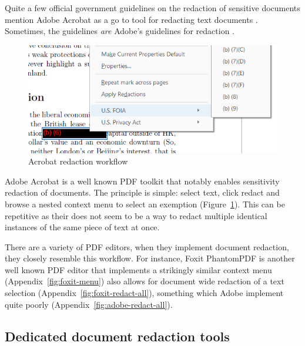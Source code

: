 \documentclass[\version]{l4proj}
\begin{document}
Quite a few official government guidelines on the redaction of sensitive documents mention Adobe Acrobat as a go to tool for redacting text documents \autocite{thenationalarchivesRedactionToolkitPaper2016}.
Sometimes, the guidelines \textit{are} Adobe's guidelines for redaction \autocite{scottishgovernmentRedactingInformation2019}.

\begin{figure}
    \includegraphics[width=\linewidth]{images/related_products/adobe_redaction.png}
    \caption{Acrobat redaction workflow}\label{fig:adobe-redaction}
    \vspace{-20pt}
\end{figure}

Adobe Acrobat is a well known PDF toolkit that notably enables sensitivity redaction of documents.
The principle is simple: select text, click redact and browse a nested context menu to select an exemption (Figure~\ref{fig:adobe-redaction}).
This can be repetitive as their does not seem to be a way to redact multiple identical instances of the same piece of text at once.

There are a variety of PDF editors, when they implement document redaction, they closely resemble this workflow.
For instance, Foxit PhantomPDF is another well known PDF editor that implements a strikingly similar context menu (Appendix~\ref{fig:foxit-menu}) also allows for document wide redaction of a text selection (Appendix~\ref{fig:foxit-redact-all}), something which Adobe implement quite poorly (Appendix~\ref{fig:adobe-redact-all}).

\subsection{Dedicated document redaction tools}
\end{document}
